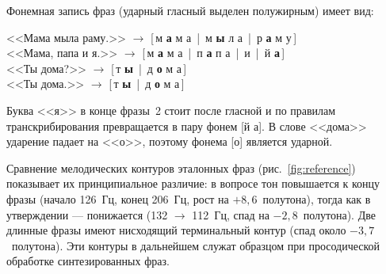 Фонемная запись фраз (ударный гласный выделен полужирным) имеет вид:
\begin{center}\small
	<<Мама мыла раму.>> $\to$ [\,м \textbf{а} м а~|~м \textbf{ы} л а~|~р \textbf{а} м у\,]\\
	<<Мама, папа и я.>> $\to$ [\,м \textbf{а} м а~|~п \textbf{а} п а~|~и~|~й \textbf{а}\,]\\
	<<Ты дома?>> $\to$ [\,т \textbf{ы}~|~д \textbf{о} м а\,]\\
	<<Ты дома.>> $\to$ [\,т \textbf{ы}~|~д \textbf{о} м а\,]
\end{center}
Буква <<я>> в конце фразы~2 стоит после гласной и по правилам
транскрибирования превращается в пару фонем [й а]. В слове <<дома>>
ударение падает на <<о>>, поэтому фонема [о] является ударной.

Сравнение мелодических контуров эталонных фраз (рис.~\ref{fig:reference})
показывает их принципиальное различие: в вопросе тон повышается к концу
фразы (начало 126~Гц, конец 206~Гц, рост на $+8{,}6$~полутона), тогда как
в утверждении --- понижается (132 \(\to\) 112~Гц, спад на
$-2{,}8$~полутона). Две длинные фразы имеют нисходящий терминальный контур
(спад около $-3{,}7$~полутона). Эти контуры в дальнейшем служат образцом
при просодической обработке синтезированных фраз.
